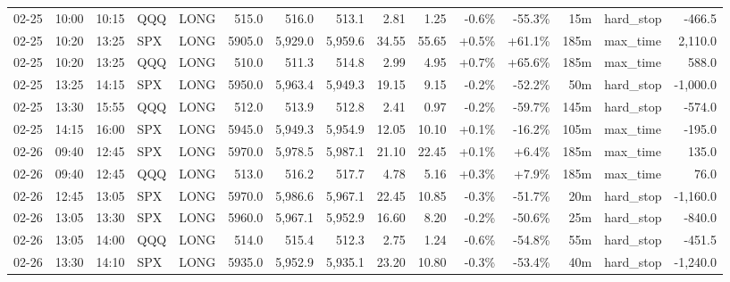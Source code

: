 \documentclass[11pt,a4paper,twoside]{article}
\begin{document}
\begin{landscape}
\begin{center}
\begin{longtable}{>{\color{txtmain}}l l l l l r r r r r r r r >{\color{txtmain}}l r}
02-25 & 10:00 & 10:15 & QQQ & LONG & 515.0 & 516.0 & 513.1 & 2.81 & 1.25 & \textcolor{lossred}{-0.6\%} & \textcolor{lossred}{-55.3\%} & 15m & hard\_stop & \textcolor{lossred}{-466.5} \\
02-25 & 10:20 & 13:25 & SPX & LONG & 5905.0 & 5,929.0 & 5,959.6 & 34.55 & 55.65 & \textcolor{wingreen}{+0.5\%} & \textcolor{wingreen}{+61.1\%} & 185m & max\_time & \textcolor{wingreen}{2,110.0} \\
02-25 & 10:20 & 13:25 & QQQ & LONG & 510.0 & 511.3 & 514.8 & 2.99 & 4.95 & \textcolor{wingreen}{+0.7\%} & \textcolor{wingreen}{+65.6\%} & 185m & max\_time & \textcolor{wingreen}{588.0} \\
02-25 & 13:25 & 14:15 & SPX & LONG & 5950.0 & 5,963.4 & 5,949.3 & 19.15 & 9.15 & \textcolor{lossred}{-0.2\%} & \textcolor{lossred}{-52.2\%} & 50m & hard\_stop & \textcolor{lossred}{-1,000.0} \\
02-25 & 13:30 & 15:55 & QQQ & LONG & 512.0 & 513.9 & 512.8 & 2.41 & 0.97 & \textcolor{lossred}{-0.2\%} & \textcolor{lossred}{-59.7\%} & 145m & hard\_stop & \textcolor{lossred}{-574.0} \\
02-25 & 14:15 & 16:00 & SPX & LONG & 5945.0 & 5,949.3 & 5,954.9 & 12.05 & 10.10 & \textcolor{wingreen}{+0.1\%} & \textcolor{lossred}{-16.2\%} & 105m & max\_time & \textcolor{lossred}{-195.0} \\
02-26 & 09:40 & 12:45 & SPX & LONG & 5970.0 & 5,978.5 & 5,987.1 & 21.10 & 22.45 & \textcolor{wingreen}{+0.1\%} & \textcolor{wingreen}{+6.4\%} & 185m & max\_time & \textcolor{wingreen}{135.0} \\
02-26 & 09:40 & 12:45 & QQQ & LONG & 513.0 & 516.2 & 517.7 & 4.78 & 5.16 & \textcolor{wingreen}{+0.3\%} & \textcolor{wingreen}{+7.9\%} & 185m & max\_time & \textcolor{wingreen}{76.0} \\
02-26 & 12:45 & 13:05 & SPX & LONG & 5970.0 & 5,986.6 & 5,967.1 & 22.45 & 10.85 & \textcolor{lossred}{-0.3\%} & \textcolor{lossred}{-51.7\%} & 20m & hard\_stop & \textcolor{lossred}{-1,160.0} \\
02-26 & 13:05 & 13:30 & SPX & LONG & 5960.0 & 5,967.1 & 5,952.9 & 16.60 & 8.20 & \textcolor{lossred}{-0.2\%} & \textcolor{lossred}{-50.6\%} & 25m & hard\_stop & \textcolor{lossred}{-840.0} \\
02-26 & 13:05 & 14:00 & QQQ & LONG & 514.0 & 515.4 & 512.3 & 2.75 & 1.24 & \textcolor{lossred}{-0.6\%} & \textcolor{lossred}{-54.8\%} & 55m & hard\_stop & \textcolor{lossred}{-451.5} \\
02-26 & 13:30 & 14:10 & SPX & LONG & 5935.0 & 5,952.9 & 5,935.1 & 23.20 & 10.80 & \textcolor{lossred}{-0.3\%} & \textcolor{lossred}{-53.4\%} & 40m & hard\_stop & \textcolor{lossred}{-1,240.0} \\

\end{longtable}
\end{center}
\end{landscape}
\end{document}
